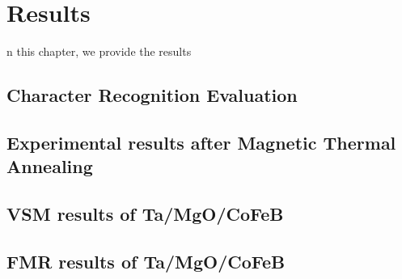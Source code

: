 \chapter{Results}
\label{ch:results}


n this chapter, we provide the results 
\section{Character Recognition Evaluation}
\section{Experimental results after Magnetic Thermal Annealing}
\section{VSM results of Ta/MgO/CoFeB}
\section{FMR results of Ta/MgO/CoFeB}